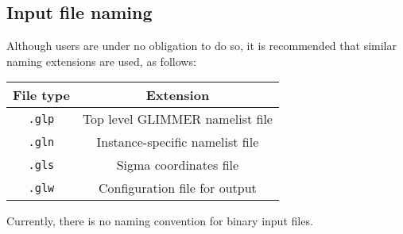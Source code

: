 \subsection{Input file naming}
%
Although users are under no obligation to do so, it is recommended that
similar naming extensions are used, as follows:
%
\begin{center}
\begin{tabular}{|c|c|}
\hline
File type & Extension \\
\hline
\hline
\texttt{.glp} & Top level GLIMMER namelist file \\
\hline
\texttt{.gln} & Instance-specific namelist file \\
\hline
\texttt{.gls} & Sigma coordinates file \\
\hline
\texttt{.glw} & Configuration file for output \\
\hline
\end{tabular}
\end{center}
%
Currently, there is no naming convention for binary input files.
%
